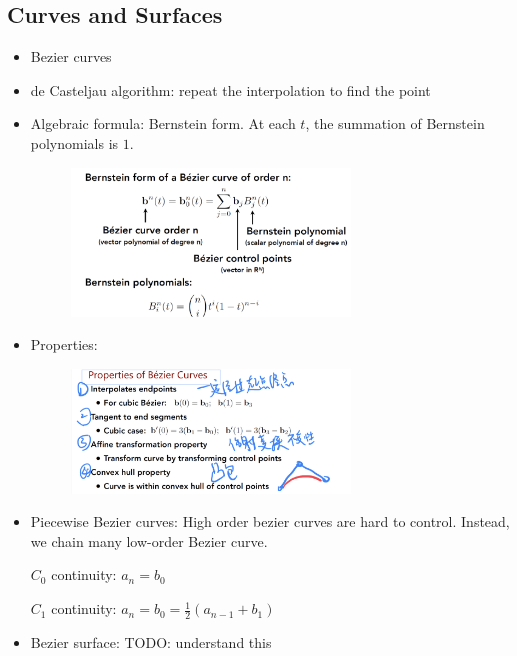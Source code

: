 \documentclass{article}
\begin{document}
\subsection{Curves and Surfaces}
\begin{itemize}
    \item Bezier curves
    \item de Casteljau algorithm: repeat the interpolation to find the point
    \item Algebraic formula: Bernstein form. At each $t$, the summation of Bernstein polynomials is $1$.
    \begin{figure}[H]
        \centering
        \includegraphics[width=0.7\textwidth]{imgs/bezier.jpeg}
    \end{figure}
    \item Properties:
    \begin{figure}[H]
        \centering
        \includegraphics[width=0.7\textwidth]{imgs/bezier1.jpg}
    \end{figure}
    
    \item Piecewise Bezier curves: High order bezier curves are hard to control. Instead, we chain many low-order Bezier curve.
    
    $C_0$ continuity: $a_n=b_0$
    
    $C_1$ continuity: $a_n=b_0=\frac{1}{2}(a_{n-1}+b_1)$
    
    \item Bezier surface: TODO: understand this
    
\end{itemize}
\end{document}
